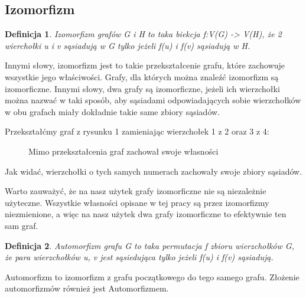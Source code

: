 \documentclass[11pt]{article}
\newtheorem{definition}{Definicja}[section]
\begin{document}
  \subsection{Izomorfizm}

  \begin{definition}
    Izomorfizm grafów G i H to taka biekcja f:V(G) -> V(H), że 2 wierchołki u i v sąsiadują w G tylko jeżeli f(u) i f(v) sąsiadują w H.
  \end{definition}

  Innymi słowy, izomorfizm jest to takie przekształcenie grafu, które zachowuje wszystkie jego właściwości. Grafy, dla których można znaleźć izomorfizm są izomorficzne. Innymi słowy, dwa grafy są izomorficzne, jeżeli ich wierzchołki można nazwać w taki sposób, 
  aby sąsiadami odpowiadających sobie wierzchołków w obu grafach miały dokładnie takie same zbiory sąsiadów.
  

  Przekształćmy graf z rysunku 1 zamieniając wierzchołek 1 z 2 oraz 3 z 4:
  \begin{figure}[H]
    \centering
    \caption{Mimo przekształcenia graf zachował swoje własności}
  \end{figure}

  Jak widać, wierzchołki o tych samych numerach zachowały swoje zbiory sąsiadów. 

  Warto zauważyć, że na nasz użytek grafy izomorficzne nie są niezależnie użyteczne. Wszystkie własności opisane w tej pracy są przez izomorfizmy niezmienione, a więc na nasz użytek dwa grafy izomorficzne to efektywnie ten sam graf.


  \begin{definition}
    Automorfizm grafu G to taka permutacja f zbioru wierzchołków G, że para wierzchołków u, v jest sąsiedująca tylko jeżeli f(u) i f(v) sąsiadują. 
  \end{definition}
  Automorfizm to izomorfizm z grafu początkowego do tego samego grafu. 
  Złożenie automorfizmów również jest Automorfizmem.  
\end{document}
